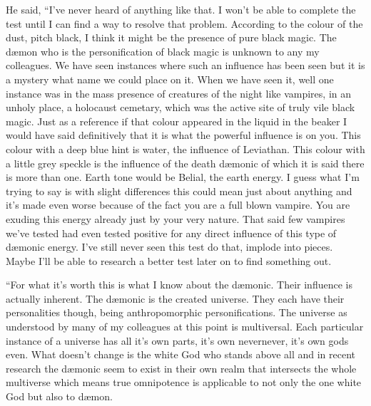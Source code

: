 He said, ``I've never heard of anything like that. I won't be able to complete the test until I can find a way to resolve that problem. According to the colour of the dust, pitch black, I think it might be the presence of pure black magic. The d\ae mon who is the personification of black magic is unknown to any my colleagues. We have seen instances where such an influence has been seen but it is a mystery what name we could place on it. When we have seen it, well one instance was in the mass presence of creatures of the night like vampires, in an unholy place, a holocaust cemetary, which was the active site of truly vile black magic. Just as a reference if that colour appeared in the liquid in the beaker I would have said definitively that it is what the powerful influence is on you. This colour with a deep blue hint is water, the influence of Leviathan. This colour with a little grey speckle is the influence of the death d\ae monic of which it is said there is more than one. Earth tone would be Belial, the earth energy. I guess what I'm trying to say is with slight differences this could mean just about anything and it's made even worse because of the fact you are a full blown vampire. You are exuding this energy already just by your very nature. That said few vampires we've tested had even tested positive for any direct influence of this type of d\ae monic energy. I've still never seen this test do that, implode into pieces.  Maybe I'll be able to research a better test later on to find something out.

``For what it's worth this is what I know about the d\ae monic. Their influence is actually inherent. The d\ae monic is the created universe. They each have their personalities though, being anthropomorphic personifications. The universe as understood by many of my colleagues at this point is multiversal. Each particular instance of a universe has all it's own parts, it's own nevernever, it's own gods even. What doesn't change is the white God who stands above all and in recent research the d\ae monic seem to exist in their own realm that intersects the whole multiverse which means true omnipotence is applicable to not only the one white God but also to d\ae mon.

